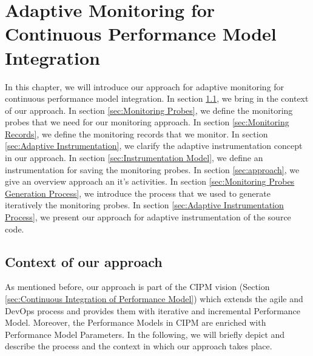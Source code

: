 

\chapter{Adaptive Monitoring for Continuous Performance Model Integration}
\label{ch:Adaptive Monitoring for Continuous Performance Model Integration}
In this chapter, we will introduce our approach for adaptive monitoring for continuous performance model integration. In section \ref{sec:Context of our approach}, we bring in the context of our approach. In section \ref{sec:Monitoring Probes}, we define the monitoring probes that we need for our monitoring approach. In section \ref{sec:Monitoring Records}, we define the monitoring records that we monitor. In section \ref{sec:Adaptive Instrumentation}, we clarify the adaptive instrumentation concept in our approach. In section \ref{sec:Instrumentation Model}, we define an instrumentation for saving the monitoring probes. In section \ref{sec:approach}, we give an overview approach an it's activities. In section \ref{sec:Monitoring Probes Generation Process}, we introduce the process that we used to generate iteratively the monitoring probes. In section \ref{sec:Adaptive Instrumentation Process}, we present our approach for adaptive instrumentation of the source code. 

\section{Context of our approach}
\label{sec:Context of our approach}
As mentioned before, our approach is part of the CIPM vision (Section \ref{sec:Continuous Integration of Performance Model}) which extends the agile and DevOps process and provides them with iterative and incremental Performance Model. Moreover, the Performance Models in CIPM are enriched with Performance Model Parameters. In the following, we will briefly depict and describe the process and the context in which our approach takes place.\\

